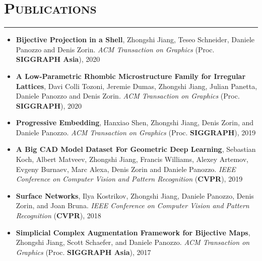 \documentclass[letterpaper,11pt]{article}
\newcommand{\resheading}[1]{
\vspace{0pt}
\section*{\scshape #1}
\rule{\textwidth}{0.5pt}
  \vspace{-15pt}
}
\newcommand{\publication}[5]{\textbf{#1}, #2. \textit{#3} (#4), #5}
\begin{document}
%

\resheading{Publications}
\vspace{-2pt}
\begin{itemize}[label=,leftmargin=*]

\item \publication{Bijective Projection in a Shell}{Zhongshi Jiang, Teseo Schneider, Daniele Panozzo and Denis Zorin}{ACM Transaction on Graphics}{Proc. \textbf{SIGGRAPH Asia}}{2020}
\item \textbf{A Low-Parametric Rhombic Microstructure Family for Irregular Lattices},
Davi Colli Tozoni, Jeremie Dumas, Zhongshi Jiang, Julian Panetta, Daniele Panozzo and Denis Zorin.
\textit{ACM Transaction on Graphics} (Proc. \textbf{SIGGRAPH}), 2020
\item \textbf{Progressive Embedding},
Hanxiao Shen, Zhongshi Jiang, Denis Zorin, and Daniele Panozzo.
\textit{ACM Transaction on Graphics} (Proc. \textbf{SIGGRAPH}), 2019

\item \textbf{A Big CAD Model Dataset For Geometric Deep Learning},
Sebastian Koch, Albert Matveev, Zhongshi Jiang, Francis Williams, Alexey Artemov, Evgeny Burnaev, Marc Alexa, Denis Zorin and Daniele Panozzo.
\textit{IEEE Conference on Computer Vision and Pattern Recognition} (\textbf{CVPR}), 2019

\item \textbf{Surface Networks},
Ilya Kostrikov, Zhongshi Jiang, Daniele Panozzo, Denis Zorin, and Joan Bruna.
\textit{IEEE Conference on Computer Vision and Pattern Recognition} (\textbf{CVPR}), 2018

\item \textbf{Simplicial Complex Augmentation Framework for Bijective Maps},
Zhongshi Jiang, Scott Schaefer, and Daniele Panozzo.
\textit{ACM Transaction on Graphics} (Proc. \textbf{SIGGRAPH Asia}), 2017
\end{itemize}
\end{document}
